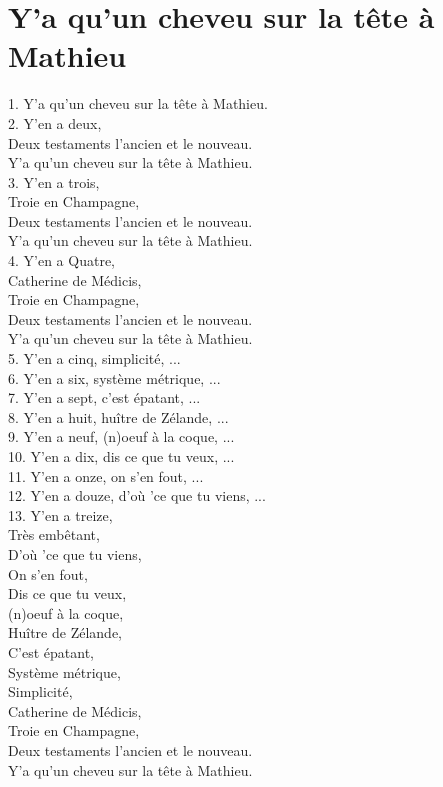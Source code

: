\section*{Y'a qu'un cheveu sur la tête à Mathieu}
1.	Y'a qu'un cheveu sur la tête à Mathieu.\\
2.	Y'en a deux,\\
Deux testaments l'ancien et le nouveau.\\
Y'a qu'un cheveu sur la tête à Mathieu.\\
3.	Y'en a trois,\\
Troie en Champagne,\\
Deux testaments l'ancien et le nouveau.\\
Y'a qu'un cheveu sur la tête à Mathieu.\\
4.	Y'en a Quatre,\\
Catherine de Médicis,\\
Troie en Champagne,\\
Deux testaments l'ancien et le nouveau.\\
Y'a qu'un cheveu sur la tête à Mathieu.\\
5.	Y'en a cinq, simplicité, ...\\
6.	Y'en a six, système métrique, ...\\
7.	Y'en a sept, c'est épatant, ...\\
8.	Y'en a huit, huître de Zélande, ...\\
9.	Y'en a neuf, (n)oeuf à la coque, ...\\
10.	Y'en a dix, dis ce que tu veux, ...\\
11.	Y'en a onze, on s'en fout, ...\\
12.	Y'en a douze, d'où 'ce que tu viens, ...\\
13.	Y'en a treize,\\
Très embêtant,\\
D'où 'ce que tu viens,\\
On s'en fout,\\
Dis ce que tu veux,\\
(n)oeuf à la coque,\\
Huître de Zélande,\\
C'est épatant,\\
Système métrique,\\
Simplicité,\\
Catherine de Médicis,\\
Troie en Champagne,\\
Deux testaments l'ancien et le nouveau.\\
Y'a qu'un cheveu sur la tête à Mathieu.